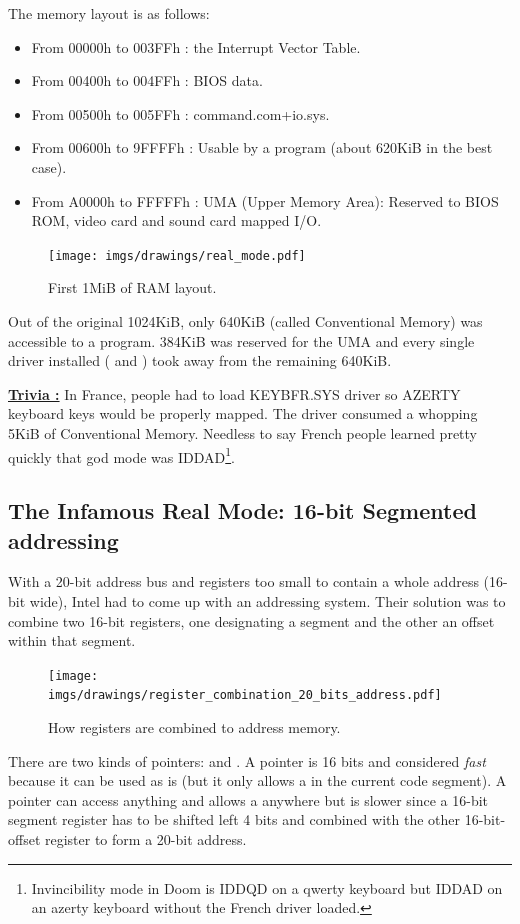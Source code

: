 \documentclass[book.tex]{subfiles}
\begin{document}
  \bigskip
The memory layout is as follows:
\begin{itemize}
\item From 00000h to 003FFh : the Interrupt Vector Table.
\item From 00400h to 004FFh : BIOS data.
\item From 00500h to 005FFh : command.com+io.sys.
\item From 00600h to 9FFFFh : Usable by a program (about 620KiB in the best case). 
\item From A0000h to FFFFFh : UMA (Upper Memory Area): Reserved to BIOS ROM, video card and sound card mapped I/O.
\end{itemize}
\par
\begin{figure}[H]
\centering
\texttt{[image: imgs/drawings/real\_mode.pdf]}
\caption{First 1MiB of RAM layout.}
\label{fig:fp_internals}
\end{figure}
\pagebreak

Out of the original 1024KiB, only 640KiB (called Conventional Memory) was accessible to a program. 384KiB was reserved for the UMA and every single driver installed ( and ) took away from the remaining 640KiB.

\bigskip

\textbf{\underline{Trivia :}}  In France, people had to load KEYBFR.SYS driver so AZERTY keyboard keys would be properly mapped. The driver consumed a whopping 5KiB of Conventional Memory. Needless to say French people learned pretty quickly that god mode was IDDAD\footnote{Invincibility mode in Doom is IDDQD on a qwerty keyboard but IDDAD on an azerty keyboard without the French driver loaded.}.\\
\par





\subsection{The Infamous Real Mode: 16-bit Segmented addressing}
With a 20-bit address bus and registers too small to contain a whole address (16-bit wide), Intel had to come up with an addressing system. Their solution was to combine two 16-bit registers, one designating a segment and the other an offset within that segment.\\
\par
\begin{figure}[H]
\centering
\texttt{[image: imgs/drawings/register\_combination\_20\_bits\_address.pdf]}
\caption{How registers are combined to address memory.}
\label{fig:register_comb_to_20_bits}
\end{figure}
\par
There are two kinds of pointers:  and . A  pointer is 16 bits and considered \emph{fast} because it can be used as is (but it only allows a  in the current code segment). A  pointer can access anything and allows a  anywhere but is slower since a 16-bit segment register has to be shifted left 4 bits and combined with the other 16-bit-offset register to form a 20-bit address.\\
\end{document}
